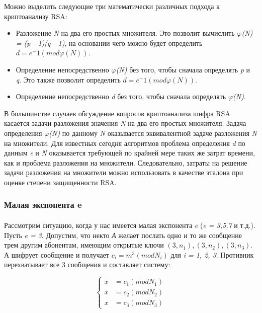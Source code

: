   Можно выделить следующие три математически различных подхода к криптоанализу RSA:
  
    \begin{itemize}
     \item Разложение \textit{N} на два его простых множителя. Это позволит вычислить \textit{{$\varphi$}(N) = (p - 1)(q - 1)}, на основании чего можно будет 
     определить \textit{{$d = e^-1(mod \varphi(N))$}}.
     \item Определение непосредственно \textit{{$\varphi$}(N)} без того, чтобы сначала определять \textit{p} и \textit{q}. Это также позволит
     определить \textit{{$d = e^-1(mod \varphi(N))$}}.
     \item Определение непосредственно \textit{d} без того, чтобы сначала определять \textit{{$\varphi$}(N)}.
    \end{itemize}
    
  В большинстве случаев обсуждение вопросов криптоанализа шифра RSA касается задачи разложения значения \textit{N} на два его простых множителя. 
  Задача определения \textit{{$\varphi$}(N)} по данному \textit{N} оказывается эквивалентной задаче разложения \textit{N} на множители. Для известных сегодня алгоритмов 
  проблема определения \textit{d} по данным \textit{e} и \textit{N} оказывается требующей по крайней мере таких же затрат времени, как и проблема разложения на 
  множители. Следовательно, затраты на решение задачи разложения на множители можно использовать в качестве эталона при оценке степени 
  защищенности RSA.

\subsubsection{Малая экспонента e}

  \paragraph{} Рассмотрим ситуацию, когда у нас имеется малая экспонента \textit{e} (\textit{e = 3,5,7} и т.д.). Пусть \textit{e = 3}. Допустим, что некто
  \textit{А} желает послать одно и то же сообщение трем другим абонентам, имеющим открытые ключи \textit{{$(3, n_1), (3, n_2), (3, n_3)$}}. А шифрует 
  сообщение и получает \textit{{$c_i = m^3(mod N_i)$}} для \textit{i = 1, 2, 3}. Противник перехватывает все 3 сообщения и составляет систему:
  
    \begin{equation}
	\begin{cases}
	   x &= c_1(mod N_1) \\
	   x &= c_2(mod N_2)\\
	   x &= c_3(mod N_3)
	\end{cases}    
    \end{equation}

